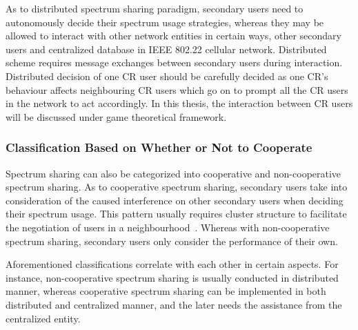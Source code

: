 As to distributed spectrum sharing paradigm, secondary users need to autonomously decide their spectrum usage strategies, whereas they may be allowed to interact with other network entities in certain ways, \ie other secondary users and centralized database in IEEE 802.22 cellular network.
Distributed scheme requires message exchanges between secondary users during interaction.
Distributed decision of one CR user should be carefully decided as one CR's behaviour affects neighbouring CR users which go on to prompt all the CR users in the network to act accordingly.
In this thesis, the interaction between CR users will be discussed under game theoretical framework.


\subsubsection*{Classification Based on Whether or Not to Cooperate}
Spectrum sharing can also be categorized into cooperative and non-cooperative spectrum sharing.
As to cooperative spectrum sharing, secondary users take into consideration of the caused interference on other secondary users when deciding their spectrum usage.
This pattern usually requires cluster structure to facilitate the negotiation of users in a neighbourhood~\cite{Chen07}.
Whereas with non-cooperative spectrum sharing, secondary users only consider the performance of their own.

Aforementioned classifications correlate with each other in certain aspects.
For instance, non-cooperative spectrum sharing is usually conducted in distributed manner, whereas cooperative spectrum sharing can be implemented in both distributed and centralized manner, and the later needs the assistance from the centralized entity.




